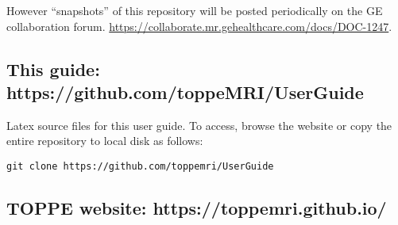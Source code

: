 However ``snapshots'' of this repository will be posted periodically on the GE collaboration forum.
\url{https://collaborate.mr.gehealthcare.com/docs/DOC-1247}.


\subsection{This guide: https://github.com/toppeMRI/UserGuide}

Latex source files for this user guide.
To access, browse the website or copy the entire repository to local disk as follows:
\begin{lstlisting}
git clone https://github.com/toppemri/UserGuide
\end{lstlisting}



\subsection{TOPPE website: https://toppemri.github.io/}






